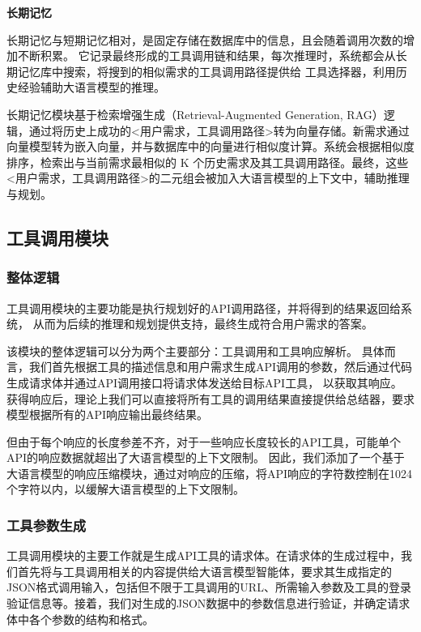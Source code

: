 \indent \textbf{长期记忆}

长期记忆与短期记忆相对，是固定存储在数据库中的信息，且会随着调用次数的增加不断积累。
它记录最终形成的工具调用链和结果，每次推理时，系统都会从长期记忆库中搜索，将搜到的相似需求的工具调用路径提供给
工具选择器，利用历史经验辅助大语言模型的推理。

长期记忆模块基于检索增强生成（Retrieval-Augmented Generation, RAG）逻辑，通过将历史上成功的<用户需求，工具调用路径>转为向量存储。新需求通过向量模型转为嵌入向量，并与数据库中的向量进行相似度计算。系统会根据相似度排序，检索出与当前需求最相似的 K 个历史需求及其工具调用路径。最终，这些<用户需求，工具调用路径>的二元组会被加入大语言模型的上下文中，辅助推理与规划。

\subsection{工具调用模块}
\label{sec:real_tool_simulation}

\subsubsection{整体逻辑}

工具调用模块的主要功能是执行规划好的API调用路径，并将得到的结果返回给系统，
从而为后续的推理和规划提供支持，最终生成符合用户需求的答案。

该模块的整体逻辑可以分为两个主要部分：工具调用和工具响应解析。
具体而言，我们首先根据工具的描述信息和用户需求生成API调用的参数，然后通过代码生成请求体并通过API调用接口将请求体发送给目标API工具，
以获取其响应。
获得响应后，理论上我们可以直接将所有工具的调用结果直接提供给总结器，要求模型根据所有的API响应输出最终结果。

但由于每个响应的长度参差不齐，对于一些响应长度较长的API工具，可能单个API的响应数据就超出了大语言模型的上下文限制。
因此，我们添加了一个基于大语言模型的响应压缩模块，通过对响应的压缩，将API响应的字符数控制在1024个字符以内，以缓解大语言模型的上下文限制。

\subsubsection{工具参数生成}

工具调用模块的主要工作就是生成API工具的请求体。在请求体的生成过程中，我们首先将与工具调用相关的内容提供给大语言模型智能体，要求其生成指定的JSON格式调用输入，包括但不限于工具调用的URL、所需输入参数及工具的登录验证信息等。接着，我们对生成的JSON数据中的参数信息进行验证，并确定请求体中各个参数的结构和格式。

